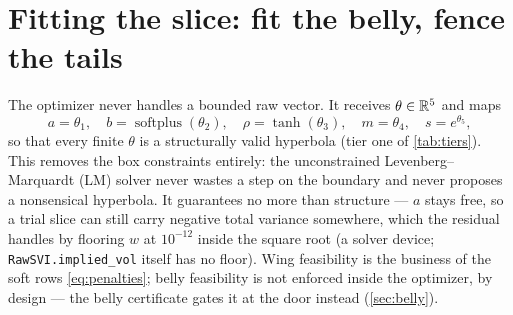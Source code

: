 \documentclass[11pt]{article}
\begin{document}
\section{Fitting the slice: fit the belly, fence the tails}
\label{sec:calib}

The optimizer never handles a bounded raw vector.  It receives $\theta\in\mathbb{R}^5$
and maps
\begin{equation}
a=\theta_1,\quad
b=\operatorname{softplus}(\theta_2),\quad
\rho=\tanh(\theta_3),\quad
m=\theta_4,\quad
s=e^{\theta_5},
\label{eq:reparam}
\end{equation}
so that every finite $\theta$ is a structurally valid hyperbola (tier one of
\cref{tab:tiers}).  This removes the box constraints entirely: the unconstrained
Levenberg--Marquardt (LM) solver never wastes a step on the boundary and never
proposes a nonsensical hyperbola.  It guarantees no more than structure --- $a$
stays free, so a trial slice can still carry negative total variance somewhere,
which the residual handles by flooring $w$ at $10^{-12}$ inside the square root
(a solver device; \texttt{RawSVI.implied\_vol} itself has no floor).  Wing
feasibility is the business of the soft rows \eqref{eq:penalties}; belly
feasibility is not enforced inside the optimizer, by design --- the belly
certificate gates it at the door instead (\cref{sec:belly}).
\end{document}
